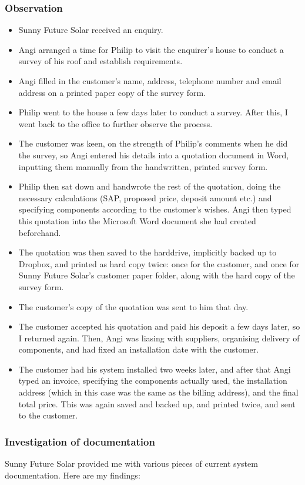 			\subsubsection{Observation}
\begin{itemize}
	\item{Sunny Future Solar received an enquiry.}
	\item{Angi arranged a time for Philip to visit the enquirer's house to conduct a survey of his roof and establish requirements.}
	\item{Angi filled in the customer's name, address, telephone number and email address on a printed paper copy of the survey form.}
	\item{Philip went to the house a few days later to conduct a survey.  After this, I went back to the office to further observe the process.}
	\item{The customer was keen, on the strength of Philip's comments when he did the survey, so Angi entered his details into a quotation document in Word, inputting them manually from the handwritten, printed survey form.}
	\item{Philip then sat down and handwrote the rest of the quotation, doing the necessary calculations (SAP, proposed price, deposit amount etc.) and specifying components according to the customer's wishes.  Angi then typed this quotation into the Microsoft Word document she had created beforehand.}
	\item{The quotation was then saved to the harddrive, implicitly backed up to Dropbox, and printed as hard copy twice: once for the customer, and once for Sunny Future Solar's customer paper folder, along with the hard copy of the survey form.}
	\item{The customer's copy of the quotation was sent to him that day.}
	\item{The customer accepted his quotation and paid his deposit a few days later, so I returned again.  Then, Angi was liasing with suppliers, organising delivery of components, and had fixed an installation date with the customer.}
	\item{The customer had his system installed two weeks later, and after that Angi typed an invoice, specifying the components actually used, the installation address (which in this case was the same as the billing address), and the final total price.  This was again saved and backed up, and printed twice, and sent to the customer.}
\end{itemize}
			\subsubsection{Investigation of documentation}
Sunny Future Solar provided me with various pieces of current system documentation.  Here are my findings:


